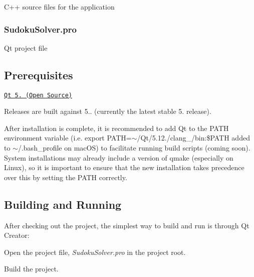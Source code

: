 \begin{DoxyItemize}
\item C++ source files for the application
\end{DoxyItemize}

\subsubsection*{Sudoku\+Solver.\+pro}


\begin{DoxyItemize}
\item Qt project file
\end{DoxyItemize}

\subsection*{Prerequisites}


\begin{DoxyItemize}
\item \href{https://www.qt.io/download}{\tt Qt 5. (Open Source)}
\begin{DoxyItemize}
\item Releases are built against 5.. (currently the latest stable 5. release).
\item After installation is complete, it is recommended to add Qt to the P\+A\+TH environment variable (i.\+e. {\ttfamily export P\+A\+TH=$\sim$/\+Qt/5.12./clang\+\_/bin\+:\$\+P\+A\+TH} added to {\ttfamily $\sim$/.bash\+\_\+profile} on mac\+OS) to facilitate running build scripts (coming soon). System installations may already include a version of {\ttfamily qmake} (especially on Linux), so it is important to ensure that the new installation takes precedence over this by setting the P\+A\+TH correctly.
\end{DoxyItemize}
\end{DoxyItemize}

\subsection*{Building and Running}

After checking out the project, the simplest way to build and run is through Qt Creator\+:


\begin{DoxyEnumerate}
\item Open the project file, {\itshape Sudoku\+Solver.\+pro} in the project root.
\item Build the project. 
\end{DoxyEnumerate}
